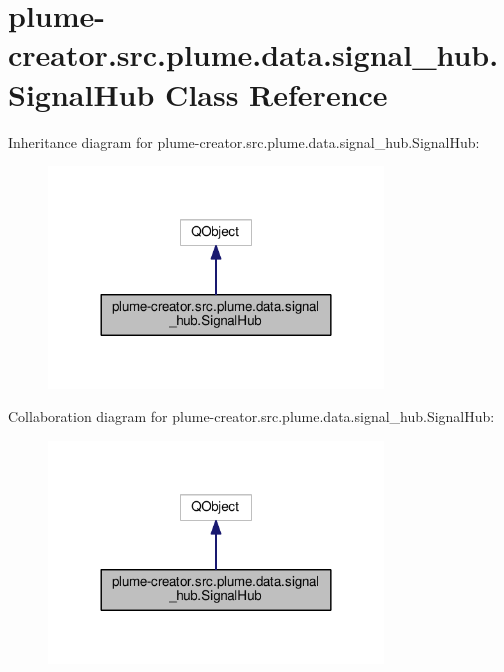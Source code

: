 \hypertarget{classplume-creator_1_1src_1_1plume_1_1data_1_1signal__hub_1_1_signal_hub}{}\section{plume-\/creator.src.\+plume.\+data.\+signal\+\_\+hub.\+Signal\+Hub Class Reference}
\label{classplume-creator_1_1src_1_1plume_1_1data_1_1signal__hub_1_1_signal_hub}


Inheritance diagram for plume-\/creator.src.\+plume.\+data.\+signal\+\_\+hub.\+Signal\+Hub\+:\nopagebreak
\begin{figure}[H]
\begin{center}
\leavevmode
\includegraphics[width=252pt]{classplume-creator_1_1src_1_1plume_1_1data_1_1signal__hub_1_1_signal_hub__inherit__graph}
\end{center}
\end{figure}


Collaboration diagram for plume-\/creator.src.\+plume.\+data.\+signal\+\_\+hub.\+Signal\+Hub\+:\nopagebreak
\begin{figure}[H]
\begin{center}
\leavevmode
\includegraphics[width=252pt]{classplume-creator_1_1src_1_1plume_1_1data_1_1signal__hub_1_1_signal_hub__coll__graph}
\end{center}
\end{figure}
